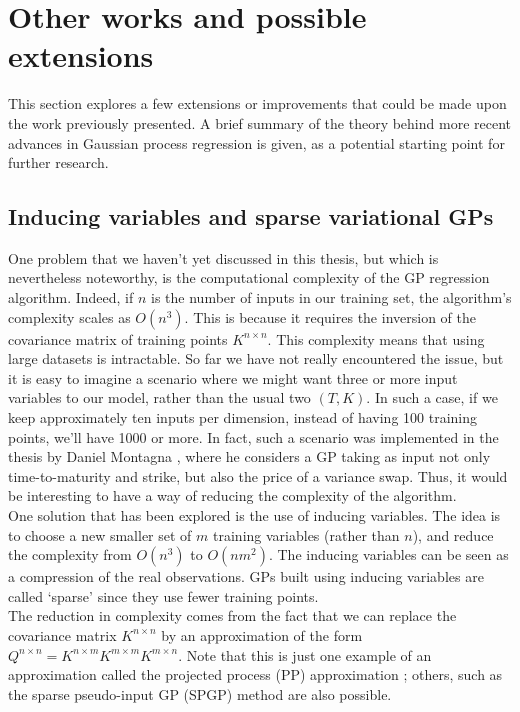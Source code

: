 \documentclass[a4paper,12pt]{article}
\begin{document}
\newpage
\section{Other works and possible extensions}
This section explores a few extensions or improvements that could be made upon the work previously presented. A brief summary of the theory behind more recent advances in Gaussian process regression is given, as a potential starting point for further research.

\subsection{Inducing variables and sparse variational GPs}
One problem that we haven't yet discussed in this thesis, but which is nevertheless noteworthy, is the computational complexity of the GP regression algorithm. Indeed, if $n$ is the number of inputs in our training set, the algorithm's complexity scales as $O(n^3)$. This is because it requires the inversion of the covariance matrix of training points $K^{n \times n}$. This complexity means that using large datasets is intractable. So far we have not really encountered the issue, but it is easy to imagine a scenario where we might want three or more input variables to our model, rather than the usual two $(T, K)$. In such a case, if we keep approximately ten inputs per dimension, instead of having 100 training points, we'll have 1000 or more. In fact, such a scenario was implemented in the thesis by Daniel Montagna \cite{Montagna2021}, where he considers a GP taking as input not only time-to-maturity and strike, but also the price of a variance swap. Thus, it would be interesting to have a way of reducing the complexity of the algorithm.\\
One solution that has been explored is the use of inducing variables. The idea is to choose a new smaller set of $m$ training variables (rather than $n$), and reduce the complexity from $O(n^3)$ to $O(n m^2)$. The inducing variables can be seen as a compression of the real observations. GPs built using inducing variables are called `sparse' since they use fewer training points.\\
The reduction in complexity comes from the fact that we can replace the covariance matrix $K^{n \times n}$ by an approximation of the form $Q^{n \times n} = K^{n \times m} K^{m \times m} K^{m\times n}$. Note that this is just one example of an approximation called the projected process (PP) approximation \cite{Seeger2003}; others, such as the sparse pseudo-input GP (SPGP) method \cite{Snelson2006} are also possible.\\
\end{document}
